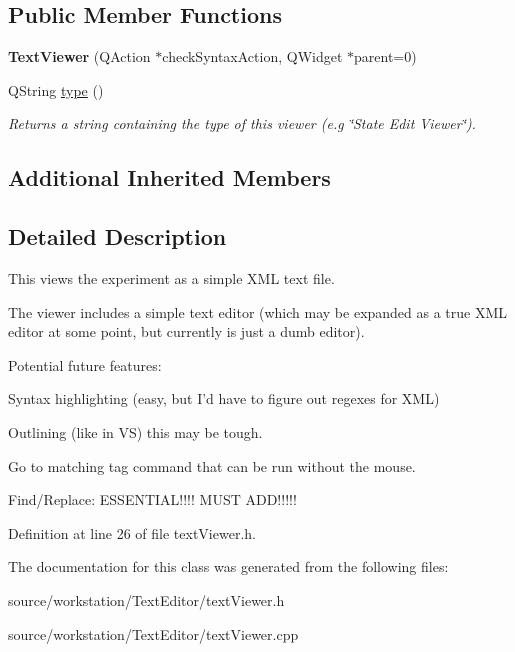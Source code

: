 \subsection*{Public Member Functions}
\begin{DoxyCompactItemize}
\item 
\hypertarget{class_text_viewer_a742934181595bf3d5017448458f1bc07}{{\bfseries Text\-Viewer} (Q\-Action $\ast$check\-Syntax\-Action, Q\-Widget $\ast$parent=0)}\label{class_text_viewer_a742934181595bf3d5017448458f1bc07}

\item 
\hypertarget{class_text_viewer_af2685e1472cbfe3f8e78ce6e40cac572}{Q\-String \hyperlink{class_text_viewer_af2685e1472cbfe3f8e78ce6e40cac572}{type} ()}\label{class_text_viewer_af2685e1472cbfe3f8e78ce6e40cac572}

\begin{DoxyCompactList}\small\item\em Returns a string containing the type of this viewer (e.\-g \char`\"{}\-State Edit Viewer\char`\"{}). \end{DoxyCompactList}\end{DoxyCompactItemize}
\subsection*{Additional Inherited Members}


\subsection{Detailed Description}
This views the experiment as a simple X\-M\-L text file. 

The viewer includes a simple text editor (which may be expanded as a true X\-M\-L editor at some point, but currently is just a dumb editor).

Potential future features\-:
\begin{DoxyItemize}
\item Syntax highlighting (easy, but I'd have to figure out regexes for X\-M\-L)
\item Outlining (like in V\-S) this may be tough.
\item Go to matching tag command that can be run without the mouse.
\item Find/\-Replace\-: E\-S\-S\-E\-N\-T\-I\-A\-L!!!! M\-U\-S\-T A\-D\-D!!!!! 
\end{DoxyItemize}

Definition at line 26 of file text\-Viewer.\-h.



The documentation for this class was generated from the following files\-:\begin{DoxyCompactItemize}
\item 
source/workstation/\-Text\-Editor/text\-Viewer.\-h\item 
source/workstation/\-Text\-Editor/text\-Viewer.\-cpp\end{DoxyCompactItemize}
